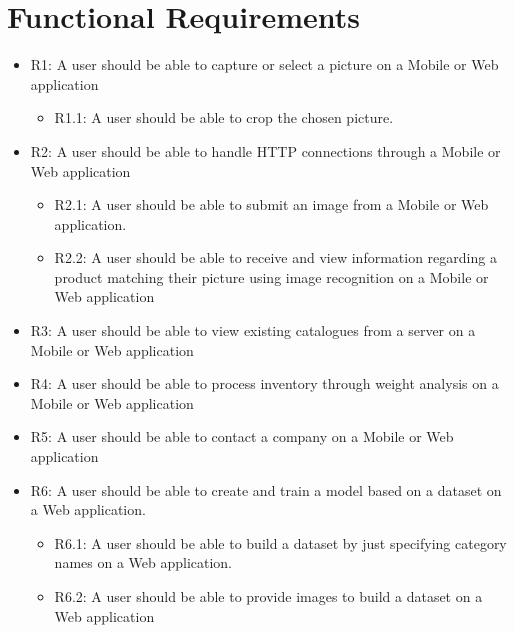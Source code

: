 \documentclass[a4paper, 11pt]{article}
\begin{document}
\section{Functional Requirements}
\begin{itemize}
    \item R1: A user should be able to capture or select a picture on a Mobile or Web application
    \begin{itemize}
        \item R1.1: A user should be able to crop the chosen picture.
    \end{itemize}
    \item R2: A user should be able to handle HTTP connections through a Mobile or Web application
    \begin{itemize}
        \item R2.1: A user should be able to submit an image from a Mobile or Web application.
        \item R2.2: A user should be able to receive and view information regarding a product matching their picture using image recognition on a Mobile or Web application
    \end{itemize}
    \item R3: A user should be able to view existing catalogues from a server on a Mobile or Web application
    \item R4: A user should be able to process inventory through weight analysis on a Mobile or Web application
    \item R5: A user should be able to contact a company on a Mobile or Web application
    \item R6: A user should be able to create and train a model based on a dataset on a Web application.
    \begin{itemize}
        \item R6.1: A user should be able to build a dataset by just specifying category names on a Web application.
        \item R6.2: A user should be able to provide images to build a dataset on a Web application
    \end{itemize}
\end{itemize}
\end{document}
